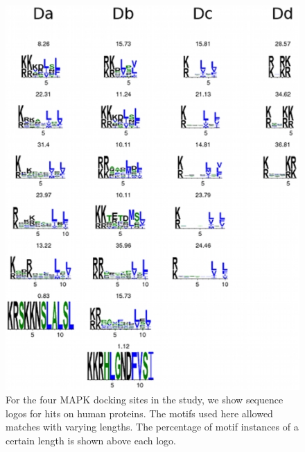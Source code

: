 
\begin{figure}
\begin{center}
\includegraphics[scale=0.75]{figs/plos1_2}
\end{center}
\caption[Human sequence logos]{\small For the four MAPK docking sites
  in the study, we show sequence logos for hits on human proteins. The
  motifs used here allowed matches with varying lengths. The
  percentage of motif instances of a certain length is shown above
  each logo. \label{fig:plos1:fig2}}
\end{figure}

